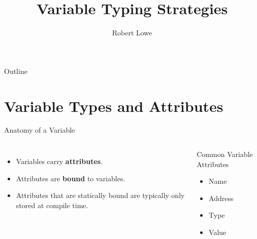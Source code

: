 \documentclass[handout]{beamer}
\title{Variable Typing Strategies}
\author{Robert Lowe}
\institute[Southeast Missouri State University] %
{
  Department of Computer Science\\
  Southeast Missouri State University
}
\date[]{}
\begin{document}
\begin{frame}
  \titlepage
\end{frame}

\begin{frame}{Outline}
  \tableofcontents
\end{frame}




\section{Variable Types and Attributes}
\begin{frame}[t]{Anatomy of a Variable}
\begin{columns}[t]
    \begin{itemize}
        \item Variables carry {\bf attributes}.
        \item Attributes are {\bf bound} to variables.
        \item Attributes that are statically bound are typically only stored at compile time.
    \end{itemize}
    
    \begin{block}{Common Variable Attributes}
    \begin{itemize}
        \item Name
        \item Address
        \item Type
        \item Value
    \end{itemize}
    \end{block}
\end{columns}
\end{frame}
\end{document}
